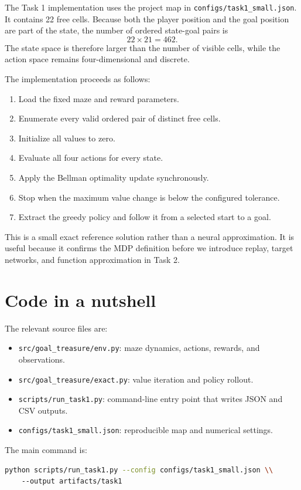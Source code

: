 \documentclass[11pt,a4paper]{article}
\begin{document}
The Task 1 implementation uses the project map in
\texttt{configs/task1\_small.json}. It contains 22 free cells. Because both the
player position and the goal position are part of the state, the number of
ordered state-goal pairs is
\[
    22\times21=462.
\]
The state space is therefore larger than the number of visible cells, while the
action space remains four-dimensional and discrete.

The implementation proceeds as follows:
\begin{enumerate}[leftmargin=*]
    \item Load the fixed maze and reward parameters.
    \item Enumerate every valid ordered pair of distinct free cells.
    \item Initialize all values to zero.
    \item Evaluate all four actions for every state.
    \item Apply the Bellman optimality update synchronously.
    \item Stop when the maximum value change is below the configured tolerance.
    \item Extract the greedy policy and follow it from a selected start to a goal.
\end{enumerate}

This is a small exact reference solution rather than a neural approximation. It
is useful because it confirms the MDP definition before we introduce replay,
target networks, and function approximation in Task 2.

\section{Code in a nutshell}

The relevant source files are:
\begin{itemize}[leftmargin=*]
    \item \texttt{src/goal\_treasure/env.py}: maze dynamics, actions, rewards, and observations.
    \item \texttt{src/goal\_treasure/exact.py}: value iteration and policy rollout.
    \item \texttt{scripts/run\_task1.py}: command-line entry point that writes JSON and CSV outputs.
    \item \texttt{configs/task1\_small.json}: reproducible map and numerical settings.
\end{itemize}

The main command is:
\begin{lstlisting}[language=bash]
python scripts/run_task1.py --config configs/task1_small.json \\
    --output artifacts/task1
\end{lstlisting}
\end{document}
